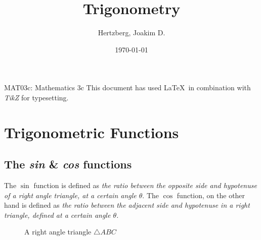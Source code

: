 \documentclass[a4paper, 12pt]{article}
\title{Trigonometry}
\author{Hertzberg, Joakim D.}
\date{\today}
\begin{document}
\begin{titlepage}
\clearpage\maketitle
\begin{center}
MAT03c: Mathematics 3c \bigbreak
\vfill
This document has used \LaTeX\ in combination with \emph{TikZ} for typesetting.
\end{center}
\thispagestyle{empty}
\end{titlepage}



\section{Trigonometric Functions}


\subsection{The \emph{sin} \& \emph{cos} functions}


The $\sin$ function is defined as \emph{the ratio between the opposite side and hypotenuse of a right angle triangle, at a certain angle $\theta$}. The $\cos$ function, on the other hand is defined as \emph{the ratio between the adjacent side and hypotenuse in a right triangle, defined at a certain angle $\theta$.}

\begin{figure}
\begin{center}
\end{center}
\caption{A right angle triangle $\triangle ABC$}
\label{fig:tri1}
\end{figure} \bigbreak
\end{document}
